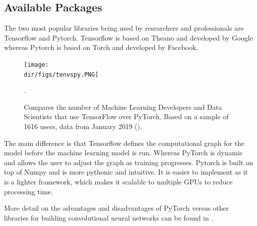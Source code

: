 \subsection{Available Packages}
The two most popular libraries being used by researchers and professionals are Tensorflow and Pytorch. Tensorflow is based on Theano and developed by Google whereas Pytorch is based on Torch and developed by Facebook.
\begin{figure}[htpb]
    \centering
    \texttt{[image: \\dir/figs/tenvspy.PNG]}
    \caption[TensorFlow versus PyTorch Usage]{Compares the number of Machine Learning Developers and Data Scientists that use TensorFlow over PyTorch. Based on a sample of 1616 users, data from January 2019 (\cite{Rosenzvaig19}). }.
    \label{fig.tfvspy}
\end{figure}
The main difference is that Tensorflow defines the computational graph for the model before the machine learning model is run. Whereas PyTorch is dynamic and allows the user to adjust the graph as training progresses. Pytorch is built on top of Numpy and is more pythonic and intuitive. It is easier to implement as it is a lighter framework, which makes it scalable to multiple GPUs to reduce processing time.
\par
More detail on the advantages and disadvantages of PyTorch versus other libraries for building convolutional neural networks can be found in \citet{Richmond19b}.

